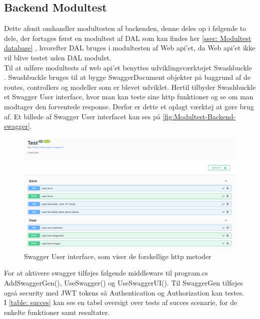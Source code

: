 \subsection{Backend Modultest}

Dette afsnit omhandler modultesten af backenden, denne deles op i følgende to dele, der fortages først en modultest af DAL som kan findes her \autoref{ssec: Modultest database} , hvorefter DAL bruges i modultesten af Web api’et, da Web api’et ikke vil blive testet uden DAL modulet.\\

Til at udføre modultests af web api’et benyttes udviklingsværktøjet Swashbuckle \cite{Swagger}. Swashbuckle bruges til at bygge SwaggerDocument objekter på baggrund af de routes, controllers og modeller som er blevet udviklet. Hertil tilbyder Swashbuckle et Swagger User interface, hvor man kan teste sine http funktioner og se om man modtager den forventede response. Derfor er dette et oplagt værktøj at gøre brug af. Et billede af Swagger User interfacet kan ses på \autoref{fig:Modultest-Backend-swagger}.\\

\begin{figure}[H]
\centering
\includegraphics[width = \textwidth]{02-Body/Images/Backend_swagger.PNG}
\caption{Swagger User interface, som viser de forskellige http metoder}
\label{fig:Modultest-Backend-swagger}
\end{figure}

For at aktivere swagger tilføjes følgende middleware til program.cs AddSwaggerGen(), UseSwagger() og UseSwaggerUI(). Til SwaggerGen tilføjes også security med JWT tokens så Authentication og Authorization kan testes.\\

I \autoref{table: succes} kan ses en tabel oversigt over tests af succes scenarie, for de enkelte funktioner samt resultater.\\


